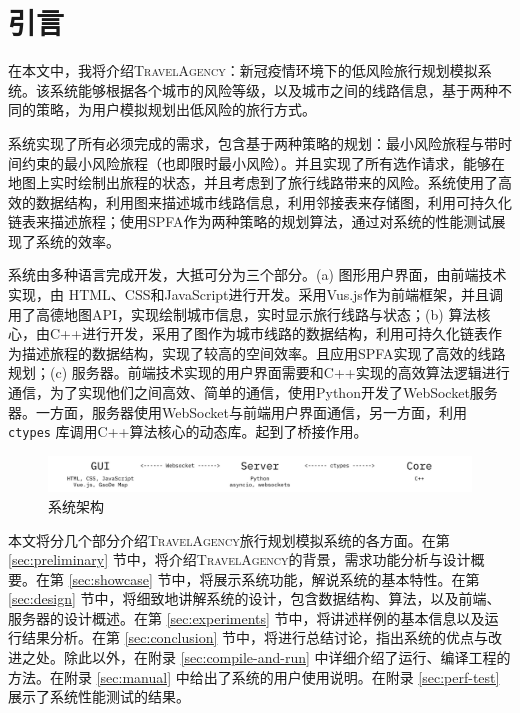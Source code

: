 \section{引言}

在本文中，我将介绍\textsc{TravelAgency}：新冠疫情环境下的低风险旅行规划模拟系统。该系统能够根据各个城市的风险等级，以及城市之间的线路信息，基于两种不同的策略，为用户模拟规划出低风险的旅行方式。

系统实现了所有必须完成的需求，包含基于两种策略的规划：最小风险旅程与带时间约束的最小风险旅程（也即限时最小风险）。并且实现了所有选作请求，能够在地图上实时绘制出旅程的状态，并且考虑到了旅行线路带来的风险。系统使用了高效的数据结构，利用图来描述城市线路信息，利用邻接表来存储图，利用可持久化链表来描述旅程；使用SPFA作为两种策略的规划算法，通过对系统的性能测试展现了系统的效率。

系统由多种语言完成开发，大抵可分为三个部分。(a) 图形用户界面，由前端技术实现，由 HTML、CSS和JavaScript进行开发。采用Vus.js作为前端框架，并且调用了高德地图API，实现绘制城市信息，实时显示旅行线路与状态；(b) 算法核心，由C++进行开发，采用了图作为城市线路的数据结构，利用可持久化链表作为描述旅程的数据结构，实现了较高的空间效率。且应用SPFA实现了高效的线路规划；(c) 服务器。前端技术实现的用户界面需要和C++实现的高效算法逻辑进行通信，为了实现他们之间高效、简单的通信，使用Python开发了WebSocket服务器。一方面，服务器使用WebSocket与前端用户界面通信，另一方面，利用 \lstinline{ctypes} 库调用C++算法核心的动态库。起到了桥接作用。

\begin{figure}[h]
\centering
\includegraphics[width=\textwidth]{figures/language_arch}
\caption{系统架构}
\label{fig:language-arch}
\end{figure}

本文将分几个部分介绍\textsc{TravelAgency}旅行规划模拟系统的各方面。在第 \ref{sec:preliminary} 节中，将介绍\textsc{TravelAgency}的背景，需求功能分析与设计概要。在第 \ref{sec:showcase} 节中，将展示系统功能，解说系统的基本特性。在第 \ref{sec:design} 节中，将细致地讲解系统的设计，包含数据结构、算法，以及前端、服务器的设计概述。在第 \ref{sec:experiments} 节中，将讲述样例的基本信息以及运行结果分析。在第 \ref{sec:conclusion} 节中，将进行总结讨论，指出系统的优点与改进之处。除此以外，在附录 \ref{sec:compile-and-run} 中详细介绍了运行、编译工程的方法。在附录 \ref{sec:manual} 中给出了系统的用户使用说明。在附录 \ref{sec:perf-test} 展示了系统性能测试的结果。